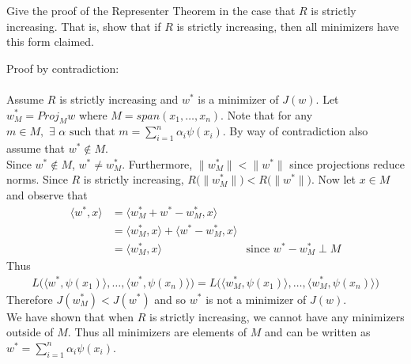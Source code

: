 \documentclass[12pt,letterpaper]{article}
\begin{document}
\begin{problem}{7.2}
Give the proof of the Representer Theorem in the case that $R$ is
strictly increasing. That is, show that if $R$ is strictly increasing,
then all minimizers have this form claimed.
\end{problem}
\begin{solution}{}
    Proof by contradiction:\\
    \\
    Assume $R$ is strictly increasing and $w^*$ is a minimizer of $J(w)$. Let $w_M^* = Proj_Mw$ where $M = span(x_1, \ldots, x_n)$. 
    Note that for any $m\in M, \,\, \exists\,\, \alpha\,\, \text{such that}\,\, m=\sum_{i=1}^{n}\alpha_{i}\psi(x_{i})$. By way of contradiction 
    also assume that $w^* \notin M$.\\
    
    Since $w^* \notin M$, $w^* \neq w_M^*$. Furthermore, $\|w_M^*\| < \|w^*\|$ since projections reduce norms. Since $R$ is strictly increasing, 
    $R\big(\|w_M^*\|\big) < R\big(\|w^*\|\big)$. Now let $x\in M$ and observe that
    \begin{align*}
        \langle w^*,x\rangle &= \langle w_M^*+w^*-w_M^*, x\rangle\\
        &= \langle w_M^*,x\rangle + \langle w^*-w_M^*, x\rangle\\
        &= \langle w_M^*, x\rangle & \text{since $w^*-w_M^* \perp M$}
    \end{align*}
    Thus 
    \begin{align*}
        L\big(\langle w^*,\psi(x_1)\rangle, \ldots,\langle w^*,\psi(x_n)\rangle\big) = L\big(\langle w_M^*,\psi(x_1)\rangle, \ldots,\langle w_M^*,\psi(x_n)\rangle\big)
    \end{align*}
    Therefore $J(w_M^*) < J(w^*)$ and so $w^*$ is not a minimizer of $J(w)$.\\
    
    We have shown that when $R$ is strictly increasing, we cannot have any minimizers outside of $M$. Thus all minimizers are elements of $M$ 
    and can be written as $w^*=\sum_{i=1}^{n}\alpha_{i}\psi(x_{i})$.
\end{solution}
\newpage
\end{document}

